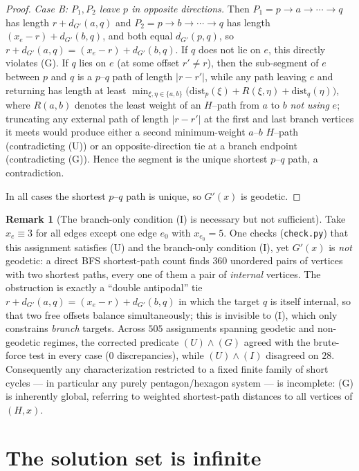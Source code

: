 \documentclass{amsart}
\theoremstyle{definition}
\newtheorem{remark}{Remark}
\begin{document}
\begin{proof}
\emph{Case B: $P_1,P_2$ leave $p$ in opposite directions.} Then
$P_1=p\to a\to\cdots\to q$ has length $r+d_{G'}(a,q)$ and
$P_2=p\to b\to\cdots\to q$ has length $(x_e-r)+d_{G'}(b,q)$, and both equal
$d_{G'}(p,q)$, so $r+d_{G'}(a,q)=(x_e-r)+d_{G'}(b,q)$. If $q$ does not lie on
$e$, this directly violates (G). If $q$ lies on $e$ (at some offset $r'\ne r$),
then the sub-segment of $e$ between $p$ and $q$ is a $p$--$q$ path of length
$|r-r'|$, while any path leaving $e$ and returning has length at least
$\min_{\xi,\eta\in\{a,b\}}\big(\mathrm{dist}_p(\xi)+R(\xi,\eta)
+\mathrm{dist}_q(\eta)\big)$, where $R(a,b)$ denotes the least weight of an
$H$--path from $a$ to $b$ \emph{not using} $e$; truncating any external path of
length $|r-r'|$ at the first and last branch vertices it meets would produce
either a second minimum-weight $a$--$b$ $H$--path (contradicting (U)) or an
opposite-direction tie at a branch endpoint (contradicting (G)). Hence the
segment is the unique shortest $p$--$q$ path, a contradiction.

In all cases the shortest $p$--$q$ path is unique, so $G'(x)$ is geodetic.
\end{proof}

\begin{remark}[The branch-only condition (I) is necessary but not
sufficient]\label{rem:counterex}
Take $x_e\equiv3$ for all edges except one edge $e_0$ with $x_{e_0}=5$. One
checks (\texttt{check.py}) that this assignment satisfies (U) and the branch-only
condition (I), yet $G'(x)$ is \emph{not} geodetic: a direct BFS shortest-path
count finds $360$ unordered pairs of vertices with two shortest paths, every one
of them a pair of \emph{internal} vertices. The obstruction is exactly a
``double antipodal'' tie
$r+d_{G'}(a,q)=(x_e-r)+d_{G'}(b,q)$ in which the target $q$ is itself internal,
so that two free offsets balance simultaneously; this is invisible to (I), which
only constrains \emph{branch} targets. Across $505$ assignments spanning geodetic
and non-geodetic regimes, the corrected predicate $(U)\wedge(G)$ agreed with the
brute-force test in every case ($0$ discrepancies), while $(U)\wedge(I)$
disagreed on $28$. Consequently any characterization restricted to a fixed finite
family of short cycles --- in particular any purely pentagon/hexagon system ---
is incomplete: (G) is inherently global, referring to weighted shortest-path
distances to all vertices of $(H,x)$.
\end{remark}

\section{The solution set is infinite}
\end{document}
